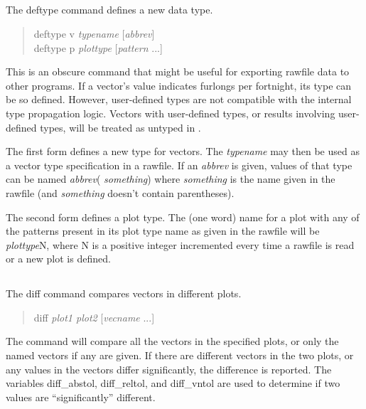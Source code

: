 \subsection{}


The {\cb deftype} command defines a new data type.
\begin{quote}\vt
    deftype v {\it typename} [{\it abbrev\/}]\\
    deftype p {\it plottype} [{\it pattern} ...]
\end{quote}
This is an obscure command that might be useful for exporting rawfile
data to other programs.  If a vector's value indicates furlongs per
fortnight, its type can be so defined.  However, user-defined types
are not compatible with the internal {\WRspice} type propagation
logic.  Vectors with user-defined types, or results involving
user-defined types, will be treated as untyped in {\WRspice}.

The first form defines a new type for vectors.  The {\it typename} may
then be used as a vector type specification in a rawfile.  If an {\it
abbrev} is given, values of that type can be named {\it abbrev}({\it
something}) where {\it something} is the name given in the rawfile
(and {\it something} doesn't contain parentheses).

The second form defines a plot type.  The (one word) name for a plot
with any of the patterns present in its plot type name as given in the
rawfile will be {\it plottype}N, where N is a positive integer
incremented every time a rawfile is read or a new plot is defined.

\subsection{}


The {\cb diff} command compares vectors in different plots.
\begin{quote}\vt
diff {\it plot1 plot2} [{\it vecname} ...]
\end{quote}
The command will compare all the vectors in the specified
plots, or only the named vectors if any are given.  If there are
different vectors in the two plots, or any values in the vectors
differ significantly, the difference is reported.  The variables {\et
diff\_abstol}, {\et diff\_reltol}, and {\et diff\_vntol} are used to
determine if two values are ``significantly'' different.

